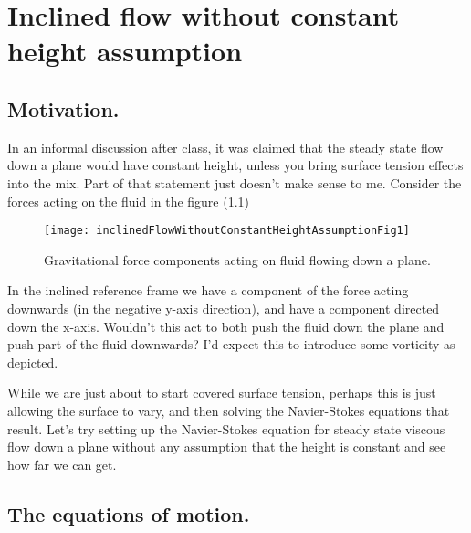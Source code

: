 
%

\chapter{Inclined flow without constant height assumption}
\label{chap:inclinedFlowWithoutConstantHeightAssumption}
{}
\date{Mar 6, 2012}

\beginArtWithToc

\section{Motivation.}

In an informal discussion after class, it was claimed that the steady state flow down a plane would have constant height, unless you bring surface tension effects into the mix.  Part of that statement just doesn't make sense to me.  Consider the forces acting on the fluid in the figure (\ref{fig:inclinedFlowWithoutConstantHeightAssumption:inclinedFlowWithoutConstantHeightAssumptionFig1})

\begin{figure}[htp]
   \centering
   \texttt{[image: inclinedFlowWithoutConstantHeightAssumptionFig1]}
\caption{Gravitational force components acting on fluid flowing down a plane.}
\label{fig:inclinedFlowWithoutConstantHeightAssumption:inclinedFlowWithoutConstantHeightAssumptionFig1}
\end{figure}

In the inclined reference frame we have a component of the force acting downwards (in the negative y-axis direction), and have a component directed down the x-axis.  Wouldn't this act to both push the fluid down the plane and push part of the fluid downwards?  I'd expect this to introduce some vorticity as depicted.

While we are just about to start covered surface tension, perhaps this is just allowing the surface to vary, and then solving the Navier-Stokes equations that result.  Let's try setting up the Navier-Stokes equation for steady state viscous flow down a plane without any assumption that the height is constant and see how far we can get.

\section{The equations of motion.}

